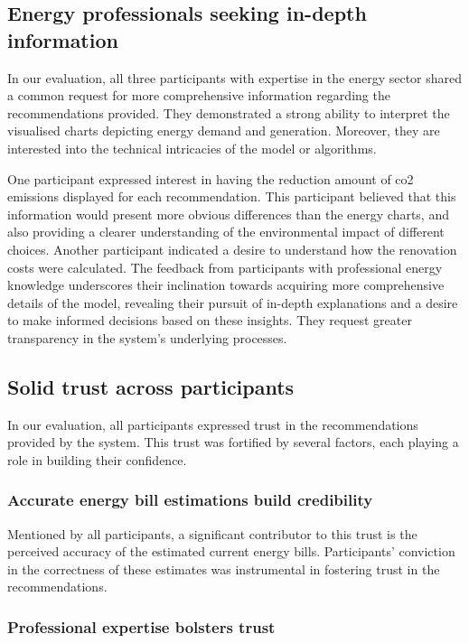 \subsection*{Energy professionals seeking in-depth information}

In our evaluation, all three participants with expertise in the energy sector shared a common request for more comprehensive information regarding the recommendations provided. 
They demonstrated a strong ability to interpret the visualised charts depicting energy demand and generation.
Moreover, they are interested into the technical intricacies of the model or algorithms. 

One participant expressed interest in having the reduction amount of \gls{co2} emissions displayed for each recommendation. 
This participant believed that this information would present more obvious differences than the energy charts, 
and also providing a clearer understanding of the environmental impact of different choices.
Another participant indicated a desire to understand how the renovation costs were calculated. 
The feedback from participants with professional energy knowledge underscores their inclination towards acquiring more comprehensive details of the model, 
revealing their pursuit of in-depth explanations and a desire to make informed decisions based on these insights. 
They request greater transparency in the system's underlying processes.


\subsection*{Solid trust across participants}

In our evaluation, all participants expressed trust in the recommendations provided by the system. 
This trust was fortified by several factors, each playing a role in building their confidence.


\subsubsection*{Accurate energy bill estimations build credibility}

Mentioned by all participants,
a significant contributor to this trust is the perceived accuracy of the estimated current energy bills. 
Participants' conviction in the correctness of these estimates was instrumental in fostering trust in the recommendations.


\subsubsection*{Professional expertise bolsters trust}

